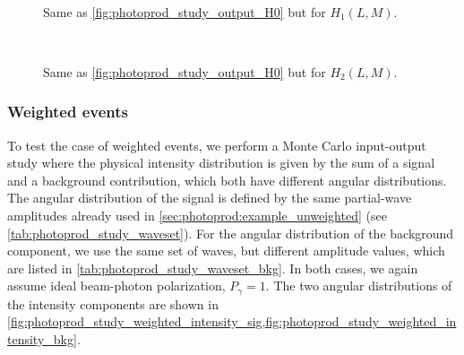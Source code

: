 \begin{figure}[tbp]
  \centering%
  \\%
  \caption{Same as \cref{fig:photoprod_study_output_H0} but for
  $H_1(L, M)$.}%
  \label{fig:photoprod_study_output_H1}%
\end{figure}

\begin{figure}[tbp]
  \centering%
  \\%
  \caption{Same as \cref{fig:photoprod_study_output_H0} but for
  $H_2(L, M)$.}%
  \label{fig:photoprod_study_output_H2}%
\end{figure}


\clearpage
\subsubsection{Weighted events}%
\label{sec:photoprod:example_weighted}

To test the case of weighted events, we perform a Monte Carlo
input-output study where the physical intensity distribution is given
by the sum of a signal and a background contribution, which both have
different angular distributions.  The angular distribution of the
signal is defined by the same partial-wave amplitudes already used in
\cref{sec:photoprod:example_unweighted} (see
\cref{tab:photoprod_study_waveset}).  For the angular distribution of
the background component, we use the same set of waves, but different
amplitude values, which are listed in
\cref{tab:photoprod_study_waveset_bkg}.  In both cases, we again
assume ideal beam-photon polarization, \ie $P_\gamma = 1$.  The two
angular distributions of the intensity components are shown in
\cref{fig:photoprod_study_weighted_intensity_sig,fig:photoprod_study_weighted_intensity_bkg}.

